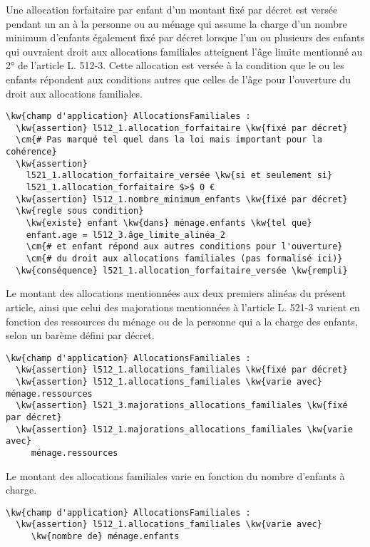 \documentclass[12pt, french]{article}
\newcommand{\cm}[1]{\textbf{\textcolor{Gray}{#1}}}
\newcommand{\kw}[1]{\textbf{\textcolor{OliveGreen}{#1}}}
\begin{document}
Une allocation forfaitaire par enfant d'un montant fixé par décret est versée pendant un an à la personne ou au ménage qui assume la charge d'un nombre minimum d'enfants également fixé par décret lorsque l'un ou plusieurs des enfants qui ouvraient droit aux allocations familiales atteignent l'âge limite mentionné au 2° de l'article L. 512-3. Cette allocation est versée à la condition que le ou les enfants répondent aux conditions autres que celles de l'âge pour l'ouverture du droit aux allocations familiales.
\begin{Verbatim}
\kw{champ d'application} AllocationsFamiliales :
  \kw{assertion} l512_1.allocation_forfaitaire \kw{fixé par décret}
  \cm{# Pas marqué tel quel dans la loi mais important pour la cohérence}
  \kw{assertion}
    l521_1.allocation_forfaitaire_versée \kw{si et seulement si}
    l521_1.allocation_forfaitaire $>$ 0 €
  \kw{assertion} l512_1.nombre_minimum_enfants \kw{fixé par décret}
  \kw{regle sous condition}
    \kw{existe} enfant \kw{dans} ménage.enfants \kw{tel que}
    enfant.age = l512_3.âge_limite_alinéa_2
    \cm{# et enfant répond aux autres conditions pour l'ouverture}
    \cm{# du droit aux allocations familiales (pas formalisé ici)}
  \kw{conséquence} l521_1.allocation_forfaitaire_versée \kw{rempli}
\end{Verbatim}

Le montant des allocations mentionnées aux deux premiers alinéas du présent article, ainsi que celui des majorations mentionnées à l'article L. 521-3 varient en fonction des ressources du ménage ou de la personne qui a la charge des enfants, selon un barème défini par décret.
\begin{Verbatim}
\kw{champ d'application} AllocationsFamiliales :
  \kw{assertion} l512_1.allocations_familiales \kw{fixé par décret}
  \kw{assertion} l512_1.allocations_familiales \kw{varie avec} ménage.ressources
  \kw{assertion} l521_3.majorations_allocations_familiales \kw{fixé par décret}
  \kw{assertion} l512_1.majorations_allocations_familiales \kw{varie avec}
     ménage.ressources
\end{Verbatim}

Le montant des allocations familiales varie en fonction du nombre d'enfants à charge.

\begin{Verbatim}
\kw{champ d'application} AllocationsFamiliales :
  \kw{assertion} l512_1.allocations_familiales \kw{varie avec}
     \kw{nombre de} ménage.enfants
\end{Verbatim}
\end{document}
